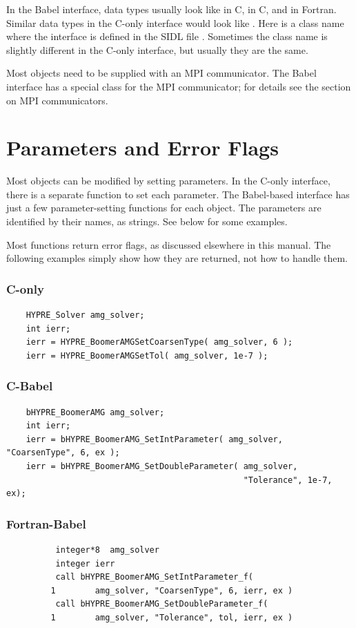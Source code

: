 In the Babel interface, data types usually look like  in
C,  in C, and  in Fortran.  Similar
data types in the C-only interface would look like
.  Here  is a class name where the
interface is defined in the SIDL file .
Sometimes the class name is slightly different in the C-only
interface, but usually they are the same.

Most \hypre{} objects need to be supplied with an MPI communicator.
The Babel interface has a special class for the MPI communicator; for
details see the section on MPI communicators.

\section{Parameters and Error Flags}

Most \hypre{} objects can be modified by setting parameters.  In the
C-only interface, there is a separate function to set each parameter.
The Babel-based interface has just a few parameter-setting functions
for each object.  The parameters are identified by their names, as
strings.  See below for some examples.

Most \hypre{} functions return error flags, as discussed elsewhere in
this manual. The following examples simply show how they are returned,
not how to handle them.

\subsubsection{C-only}
\begin{verbatim}
    HYPRE_Solver amg_solver;
    int ierr;
    ierr = HYPRE_BoomerAMGSetCoarsenType( amg_solver, 6 );
    ierr = HYPRE_BoomerAMGSetTol( amg_solver, 1e-7 );
\end{verbatim}

\subsubsection{C-Babel}
\begin{verbatim}
    bHYPRE_BoomerAMG amg_solver;
    int ierr;
    ierr = bHYPRE_BoomerAMG_SetIntParameter( amg_solver, "CoarsenType", 6, ex );
    ierr = bHYPRE_BoomerAMG_SetDoubleParameter( amg_solver,
                                                "Tolerance", 1e-7, ex);
\end{verbatim}

\subsubsection{Fortran-Babel}
\begin{verbatim}
          integer*8  amg_solver
          integer ierr
          call bHYPRE_BoomerAMG_SetIntParameter_f(
         1        amg_solver, "CoarsenType", 6, ierr, ex )
          call bHYPRE_BoomerAMG_SetDoubleParameter_f(
         1        amg_solver, "Tolerance", tol, ierr, ex )
\end{verbatim}

